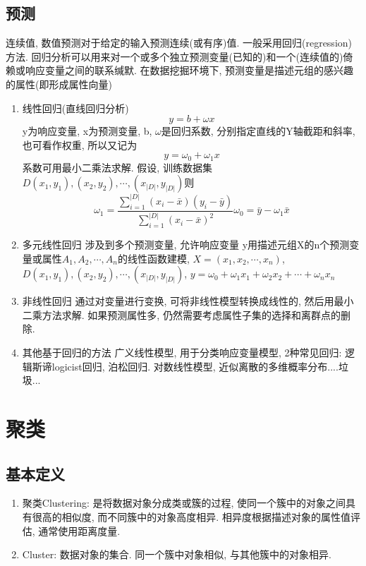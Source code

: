 \documentclass[a4paper,10pt,english]{article}
\begin{document}
\subsection{预测}
连续值, 数值预测对于给定的输入预测连续(或有序)值. 一般采用回归(regression)方法. 回归分析可以用来对一个或多个独立预测变量(已知的)和一个(连续值的)倚赖或响应变量之间的联系缄默. 在数据挖掘环境下, 预测变量是描述元组的感兴趣的属性(即形成属性向量)
\begin{enumerate}
\item {线性回归(直线回归分析)}
$$ y = b + \omega x $$ y为响应变量, x为预测变量, b, $\omega$是回归系数, 分别指定直线的Y轴截距和斜率, 也可看作权重, 所以又记为$$ y = \omega_0 + \omega_1x $$ 系数可用最小二乘法求解. 假设, 训练数据集 $ D (x_1, y_1), (x_2, y_2), \cdots, (x_{\lvert D \rvert}, y_{\lvert D \rvert})$则 $$ \omega_1 = \frac{\sum_{i=1}^{\lvert D \rvert}(x_i- \bar{x})(y_i - \bar{y})}{\sum_{i=1}^{\lvert D \rvert}(x_i - \bar{x})^2}  \omega_0 = \bar{y} - \omega_1\bar{x}$$
\item {多元线性回归}
涉及到多个预测变量, 允许响应变量 y用描述元组X的n个预测变量或属性$A_1, A_2, \cdots, A_n$的线性函数建模, $X=(x_1, x_2, \cdots, x_n)$, $ D (x_1, y_1), (x_2, y_2), \cdots, (x_{\lvert D \rvert}, y_{\lvert D \rvert})$, $ y = \omega_0 + \omega_1x_1 + \omega_2x_2 + \cdots + \omega_nx_n $
\item {非线性回归}
通过对变量进行变换, 可将非线性模型转换成线性的, 然后用最小二乘方法求解. 如果预测属性多, 仍然需要考虑属性子集的选择和离群点的删除.
\item {其他基于回归的方法}
广义线性模型, 用于分类响应变量模型, 2种常见回归: 逻辑斯谛logicist回归, 泊松回归. 对数线性模型, 近似离散的多维概率分布....垃圾...
\end{enumerate}

\clearpage
\section{聚类}
\subsection{基本定义}
\begin{enumerate}
\item {聚类Clustering:}
是将数据对象分成类或簇的过程, 使同一个簇中的对象之间具有很高的相似度, 而不同簇中的对象高度相异. 相异度根据描述对象的属性值评估, 通常使用距离度量.
\item {Cluster:}
数据对象的集合. 同一个簇中对象相似, 与其他簇中的对象相异.
\end{enumerate}
\end{document}
